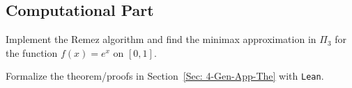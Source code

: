 \subsection{Computational Part}
\begin{problem}
    Implement the Remez algorithm and find the minimax approximation in $\Pi_3$ for the function $f(x) = e^x$ on $[0, 1]$.
\end{problem}

\begin{problem}
    Formalize the theorem/proofs in Section~\ref{Sec: 4-Gen-App-The} with \texttt{Lean}.
\end{problem}

\nocite{trefethen2019approximation,cheney2009course, muskhelishvili2008singular, elliott1974asymptotic}



